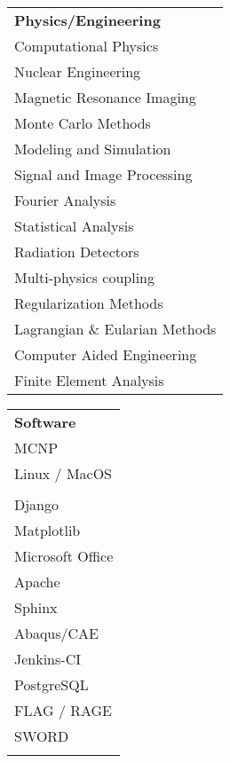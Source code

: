
\begin{minipage}{0.31\textwidth}
\begin{tabular}{l}
	{\large\textbf{Physics/Engineering}} \\
	\highskillbw Computational Physics \\
	\highskillbw Nuclear Engineering \\
	\highskillbw Magnetic Resonance Imaging \\ 
	\highskillbw Monte Carlo Methods \\
	\highskillbw Modeling and Simulation \\
	\highskillbw Signal and Image Processing \\
	\highskillbw Fourier Analysis \\ 
	\medskillbw Statistical Analysis \\
	\medskillbw Radiation Detectors \\
	\medskillbw Multi-physics coupling \\
	\medskillbw Regularization Methods  \\
	\medskillbw Lagrangian \& Eularian Methods \\
	\lowskillbw Computer Aided Engineering \\
	\lowskillbw Finite Element Analysis \\
\end{tabular}
\end{minipage}%
\begin{minipage}{0.18\textwidth}
	\begin{center}
\begin{tabular}{l}
	{\large\textbf{Software}} \\
	\highskillbw \textsc{MCNP} \\
	\highskillbw Linux / MacOS \\ 
	\highskillbw {\fontfamily{ptm}\selectfont \LaTeX} \\ 
	\highskillbw Django  \\
	\highskillbw Matplotlib \\ 
	\highskillbw Microsoft Office \\
	\medskillbw Apache \\
	\medskillbw Sphinx  \\
	\medskillbw Abaqus/CAE \\
	\medskillbw Jenkins-CI \\
	\medskillbw PostgreSQL \\
	\lowskillbw FLAG / RAGE \\
	\lowskillbw SWORD \\
	\\
\end{tabular}
	\end{center}
\end{minipage}%
